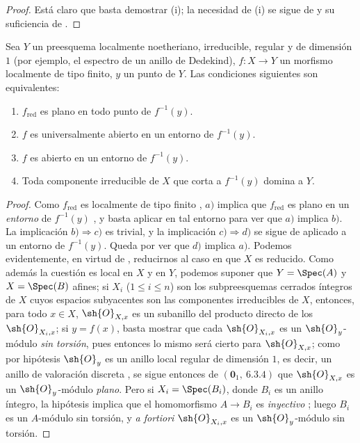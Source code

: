 \begin{proof}
Está claro que basta demostrar (i); la necesidad de (i) se sigue de  y su suficiencia de .
\end{proof}

\begin{proposition}[14.3.8]
\label{IV.14.3.8}
Sea $Y$ un preesquema localmente noetheriano, irreducible, regular y de dimensión $1$ (por ejemplo, el espectro de un anillo de Dedekind), $f:X\to Y$ un morfismo localmente de tipo finito, $y$ un punto de $Y$.
Las condiciones siguientes son equivalentes:
\begin{enumerate}[label=\emph{\alph*)}]
  \item $f_{\mathrm{red}}$ es plano en todo punto de $f^{-1}(y)$.
  \item $f$ es universalmente abierto en un entorno de $f^{-1}(y)$.
  \item $f$ es abierto en un entorno de $f^{-1}(y)$.
  \item Toda componente irreducible de $X$ que corta a $f^{-1}(y)$ domina a $Y$.
\end{enumerate}
\end{proposition}

\begin{proof}
Como $f_{\mathrm{red}}$ es localmente de tipo finito , $a)$ implica que $f_{\mathrm{red}}$ es plano en un \emph{entorno} de $f^{-1}(y)$ , y basta aplicar  en tal entorno para ver que $a)$ implica $b)$.
La implicación $b)\Rightarrow c)$ es trivial, y la implicación $c)\Rightarrow d)$ se sigue de  aplicado a un entorno de $f^{-1}(y)$.
Queda por ver que $d)$ implica $a)$.
Podemos evidentemente, en virtud de , reducirnos al caso en que $X$ es reducido.
Como además la cuestión es local en $X$ y en $Y$, podemos suponer que $Y=\Spec(A)$ y $X=\Spec(B)$
afines; si $X_i$ ($1\leq i\leq n$) son los subpreesquemas cerrados íntegros de $X$ cuyos espacios subyacentes son las componentes irreducibles de $X$, entonces, para todo $x\in X$, $\sh{O}_{X,x}$ es un subanillo del producto directo de los $\sh{O}_{X_i,x}$; si $y=f(x)$, basta mostrar que cada $\sh{O}_{X_i,x}$ es un $\sh{O}_y$-módulo \emph{sin torsión}, pues entonces lo mismo será cierto para $\sh{O}_{X,x}$; como por hipótesis $\sh{O}_y$ es un anillo local regular de dimensión $1$, es decir, un anillo de valoración discreta , se sigue entonces de $(\mathbf{0}_1,~6.3.4)$ que $\sh{O}_{X,x}$ es un $\sh{O}_y$-módulo \emph{plano}.
Pero si $X_i=\Spec(B_i)$, donde $B_i$ es un anillo íntegro, la hipótesis implica que el homomorfismo $A\to B_i$ es \emph{inyectivo} ; luego $B_i$ es un $A$-módulo sin torsión, y \emph{a fortiori} $\sh{O}_{X_i,x}$ es un $\sh{O}_y$-módulo sin torsión.
\end{proof}

